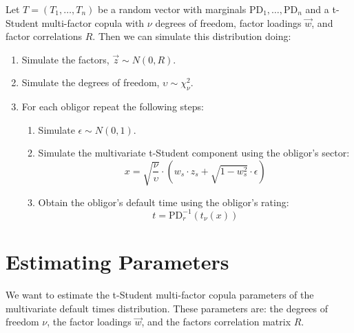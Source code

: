 \documentclass[11pt,fleqn]{book} %
\begin{document}
\begin{corollary}
	\label{cor:dts2}
	Let $T=(T_1, \dots, T_n)$ be a random vector with marginals 
	$\text{PD}_1, \dots, \text{PD}_n$ and a t-Student multi-factor copula with 
	$\nu$ degrees of freedom, factor loadings $\vec{w}$, and factor correlations 
	$R$. Then we can simulate this distribution doing:
	\begin{enumerate}
		\item Simulate the factors, $\vec{z} \sim N(0,R)$.
		\item Simulate the degrees of freedom, $\upsilon \sim \chi_{\nu}^2$.
		\item For each obligor repeat the following steps:
		\begin{enumerate}
			\item Simulate $\epsilon \sim N(0,1)$.
			\item Simulate the multivariate t-Student component using the obligor's sector:
			\begin{displaymath}
				x = \sqrt{\frac{\nu}{\upsilon}} \cdot \left( w_s \cdot z_s + \sqrt{1-w_s^2} \cdot \epsilon \right)
			\end{displaymath}
			\item Obtain the obligor's default time using the obligor's rating:
			\begin{displaymath}
				t = \text{PD}_r^{-1}\left(t_{\nu}(x)\right)
			\end{displaymath}
		\end{enumerate}
	\end{enumerate}
\end{corollary}


\chapter{Estimating Parameters}
\label{chap:estimation}

We want to estimate the t-Student multi-factor copula parameters of the 
multivariate default times distribution. These parameters are: the degrees of 
freedom $\nu$, the factor loadings $\vec{w}$, and the factors correlation 
matrix $R$.
\end{document}
